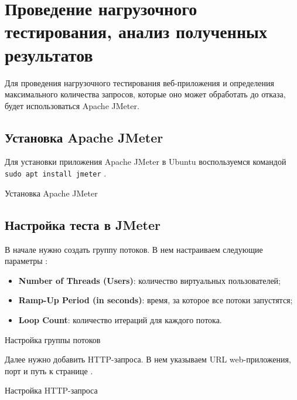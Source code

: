 \section{Проведение нагрузочного тестирования, анализ полученных результатов}

Для проведения нагрузочного тестирования веб-приложения и определения максимального количества запросов, которые оно
может обработать до отказа, будет использоваться Apache JMeter.

\subsection{Установка Apache JMeter}

Для установки приложения Apache JMeter в Ubuntu воспользуемся командой
\texttt{sudo apt install jmeter} .

\begin{image}
    \caption{Установка Apache JMeter}
    \label{fig:jmeter:install}
\end{image}

\subsection{Настройка теста в JMeter}

В начале нужно создать группу потоков.
В нем настраиваем следующие параметры :

\begin{itemize}
    \item \textbf{Number of Threads (Users)}:
    количество виртуальных пользователей;
    \item \textbf{Ramp-Up Period (in seconds)}: время,
    за которое все потоки запустятся;
    \item \textbf{Loop Count}: количество итераций для каждого потока.
\end{itemize}

\begin{image}
    \caption{Настройка группы потоков}
    \label{fig:jmeter:thread:group}
\end{image}

Далее нужно добавить HTTP-запроса. В нем указываем
URL web-приложения, порт и путь к странице .

\begin{image}
    \caption{Настройка HTTP-запроса}
    \label{fig:jmeter:http}
\end{image}

